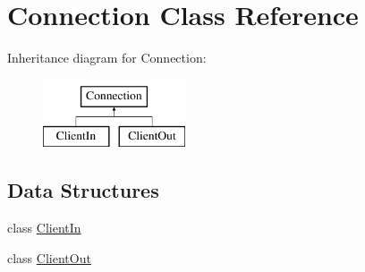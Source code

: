 \hypertarget{class_d_jabberd_1_1_connection}{
\section{\-Connection \-Class \-Reference}
\label{class_d_jabberd_1_1_connection}
}
\-Inheritance diagram for \-Connection\-:\begin{figure}[H]
\begin{center}
\leavevmode
\includegraphics[height=2.000000cm]{class_d_jabberd_1_1_connection}
\end{center}
\end{figure}
\subsection*{\-Data \-Structures}
\begin{DoxyCompactItemize}
\item 
class \hyperlink{class_d_jabberd_1_1_connection_1_1_client_in}{\-Client\-In}
\item 
class \hyperlink{class_d_jabberd_1_1_connection_1_1_client_out}{\-Client\-Out}
\end{DoxyCompactItemize}
